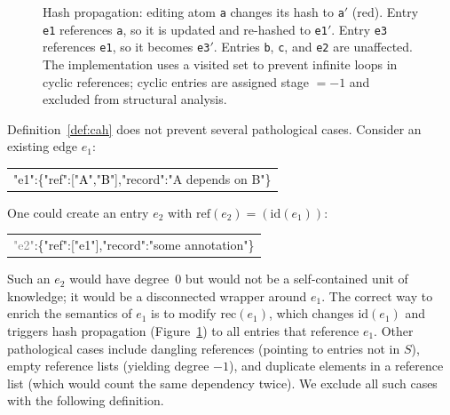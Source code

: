 \begin{figure}[ht]
\begin{minipage}[t]{0.42\textwidth}
\end{minipage}
\caption{Hash propagation: editing atom \texttt{a} changes its hash to \texttt{a$'$} (\textcolor{red!70!black}{red}). Entry \texttt{e1} references \texttt{a}, so it is updated and re-hashed to \texttt{e1$'$}. Entry \texttt{e3} references \texttt{e1}, so it becomes \texttt{e3$'$}. Entries \texttt{b}, \texttt{c}, and \texttt{e2} are unaffected. The implementation uses a visited set to prevent infinite loops in cyclic references; cyclic entries are assigned stage $= -1$ and excluded from structural analysis.}
\label{fig:propagation}
\end{figure}

Definition~\ref{def:cah} does not prevent several pathological cases. Consider an existing edge $e_1$:

\medskip
{\small\ttfamily
\begin{tabular}{@{}l@{}}
\textcolor{blue!70!black}{"e1"}:\{"ref":["\textcolor{black}{A}","\textcolor{black}{B}"],"record":"A depends on B"\}
\end{tabular}
}
\medskip

\noindent One could create an entry $e_2$ with $\mathrm{ref}(e_2) = (\mathrm{id}(e_1))$:

\medskip
{\small\ttfamily
\begin{tabular}{@{}l@{}}
\textcolor{gray}{"e2"}:\{"ref":["\textcolor{blue!70!black}{e1}"],"record":"some annotation"\}
\end{tabular}
}
\medskip

\noindent Such an $e_2$ would have degree~0 but would not be a self-contained unit of knowledge; it would be a disconnected wrapper around $e_1$. The correct way to enrich the semantics of $e_1$ is to modify $\mathrm{rec}(e_1)$, which changes $\mathrm{id}(e_1)$ and triggers hash propagation (Figure~\ref{fig:propagation}) to all entries that reference $e_1$. Other pathological cases include dangling references (pointing to entries not in $S$), empty reference lists (yielding degree $-1$), and duplicate elements in a reference list (which would count the same dependency twice). We exclude all such cases with the following definition.

